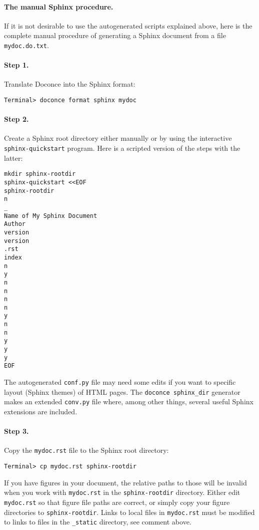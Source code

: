 \documentclass[%
oneside,                 %
final,                   %
10pt]{article}
\begin{document}
\paragraph{The manual Sphinx procedure.}
If it is not desirable to use the autogenerated scripts explained
above, here is the complete manual procedure of generating a
Sphinx document from a file {\fontsize{10pt}{10pt}\Verb!mydoc.do.txt!}.

\paragraph{Step 1.}
Translate Doconce into the Sphinx format:
\vspace{4pt}
\begin{Verbatim}[numbers=none,frame=lines,fontsize=\fontsize{9pt}{9pt},labelposition=topline,framesep=2.5mm,framerule=0.7pt]
Terminal> doconce format sphinx mydoc
\end{Verbatim}

\paragraph{Step 2.}
Create a Sphinx root directory
either manually or by using the interactive {\fontsize{10pt}{10pt}\Verb!sphinx-quickstart!}
program. Here is a scripted version of the steps with the latter:
\vspace{4pt}
\begin{Verbatim}[numbers=none,frame=lines,fontsize=\fontsize{9pt}{9pt},labelposition=topline,framesep=2.5mm,framerule=0.7pt]
mkdir sphinx-rootdir
sphinx-quickstart <<EOF
sphinx-rootdir
n
_
Name of My Sphinx Document
Author
version
version
.rst
index
n
y
n
n
n
n
y
n
n
y
y
y
EOF
\end{Verbatim}
The autogenerated {\fontsize{10pt}{10pt}\Verb!conf.py!} file
may need some edits if you want to specific layout (Sphinx themes)
of HTML pages. The {\fontsize{10pt}{10pt}\Verb!doconce sphinx_dir!} generator makes an extended {\fontsize{10pt}{10pt}\Verb!conv.py!}
file where, among other things, several useful Sphinx extensions
are included.


\paragraph{Step 3.}
Copy the {\fontsize{10pt}{10pt}\Verb!mydoc.rst!} file to the Sphinx root directory:
\vspace{4pt}
\begin{Verbatim}[numbers=none,frame=lines,fontsize=\fontsize{9pt}{9pt},labelposition=topline,framesep=2.5mm,framerule=0.7pt]
Terminal> cp mydoc.rst sphinx-rootdir
\end{Verbatim}
If you have figures in your document, the relative paths to those will
be invalid when you work with {\fontsize{10pt}{10pt}\Verb!mydoc.rst!} in the {\fontsize{10pt}{10pt}\Verb!sphinx-rootdir!}
directory. Either edit {\fontsize{10pt}{10pt}\Verb!mydoc.rst!} so that figure file paths are correct,
or simply copy your figure directories to {\fontsize{10pt}{10pt}\Verb!sphinx-rootdir!}.
Links to local files in {\fontsize{10pt}{10pt}\Verb!mydoc.rst!} must be modified to links to
files in the {\fontsize{10pt}{10pt}\Verb!_static!} directory, see comment above.
\end{document}
